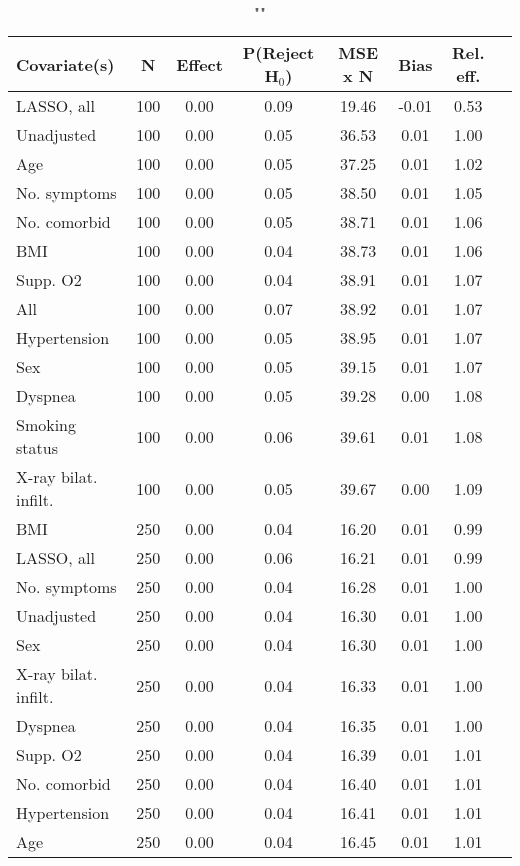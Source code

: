 \documentclass{article}
\begin{document}
{\tabcolsep=6pt  %
\begin{longtable}{lccccccc}
\caption{""} \\
Covariate(s) & N & Effect & P(Reject H$_0$) & MSE x N & Bias & Rel. eff.\\ \midrule
LASSO, all & 100 & 0.00 & 0.09 & 19.46 & -0.01 & 0.53 \\ 
Unadjusted & 100 & 0.00 & 0.05 & 36.53 &  0.01 & 1.00 \\ 
Age & 100 & 0.00 & 0.05 & 37.25 &  0.01 & 1.02 \\ 
No. symptoms & 100 & 0.00 & 0.05 & 38.50 &  0.01 & 1.05 \\ 
No. comorbid & 100 & 0.00 & 0.05 & 38.71 &  0.01 & 1.06 \\ 
BMI & 100 & 0.00 & 0.04 & 38.73 &  0.01 & 1.06 \\ 
Supp. O2 & 100 & 0.00 & 0.04 & 38.91 &  0.01 & 1.07 \\ 
All & 100 & 0.00 & 0.07 & 38.92 &  0.01 & 1.07 \\ 
Hypertension & 100 & 0.00 & 0.05 & 38.95 &  0.01 & 1.07 \\ 
Sex & 100 & 0.00 & 0.05 & 39.15 &  0.01 & 1.07 \\ 
Dyspnea & 100 & 0.00 & 0.05 & 39.28 &  0.00 & 1.08 \\ 
Smoking status & 100 & 0.00 & 0.06 & 39.61 &  0.01 & 1.08 \\ 
X-ray bilat. infilt. & 100 & 0.00 & 0.05 & 39.67 &  0.00 & 1.09 \\ \midrule 
BMI & 250 & 0.00 & 0.04 & 16.20 &  0.01 & 0.99 \\ 
LASSO, all & 250 & 0.00 & 0.06 & 16.21 &  0.01 & 0.99 \\ 
No. symptoms & 250 & 0.00 & 0.04 & 16.28 &  0.01 & 1.00 \\ 
Unadjusted & 250 & 0.00 & 0.04 & 16.30 &  0.01 & 1.00 \\ 
Sex & 250 & 0.00 & 0.04 & 16.30 &  0.01 & 1.00 \\ 
X-ray bilat. infilt. & 250 & 0.00 & 0.04 & 16.33 &  0.01 & 1.00 \\ 
Dyspnea & 250 & 0.00 & 0.04 & 16.35 &  0.01 & 1.00 \\ 
Supp. O2 & 250 & 0.00 & 0.04 & 16.39 &  0.01 & 1.01 \\ 
No. comorbid & 250 & 0.00 & 0.04 & 16.40 &  0.01 & 1.01 \\ 
Hypertension & 250 & 0.00 & 0.04 & 16.41 &  0.01 & 1.01 \\ 
Age & 250 & 0.00 & 0.04 & 16.45 &  0.01 & 1.01 \\ 

\end{longtable}}
\end{document}
